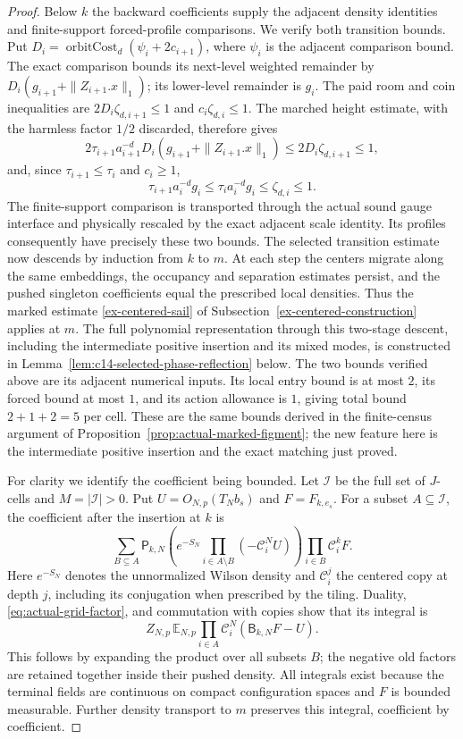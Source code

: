 \begin{proof}
Below $k$ the backward coefficients supply the adjacent density identities
and finite-support forced-profile comparisons. We verify both transition
bounds. Put $D_i=\operatorname{orbitCost}_d(\psi_i+2c_{i+1})$, where
$\psi_i$ is the adjacent comparison bound. The exact comparison bounds
its next-level weighted remainder by
$D_i(g_{i+1}+\|Z_{i+1}.x\|_1)$; its lower-level remainder is $g_i$.
The paid room and coin inequalities are
$2D_i\zeta_{d,i+1}\leq1$ and $c_i\zeta_{d,i}\leq1$.
The marched height estimate, with the harmless factor $1/2$ discarded,
therefore gives
\[
 2\tau_{i+1}a_{i+1}^{-d}
     D_i(g_{i+1}+\|Z_{i+1}.x\|_1)
       \leq2D_i\zeta_{d,i+1}\leq1,
\]
and, since $\tau_{i+1}\leq\tau_i$ and $c_i\geq1$,
\[
 \tau_{i+1}a_i^{-d}g_i
       \leq\tau_i a_i^{-d}g_i\leq\zeta_{d,i}\leq1.
\]
The finite-support comparison is transported through the actual sound
gauge interface and physically rescaled by the exact adjacent scale identity.
Its profiles consequently have precisely these two bounds. The selected
transition estimate now descends by induction from $k$ to $m$.
At each step the centers migrate along the
same embeddings, the occupancy and separation estimates persist, and the
pushed singleton coefficients equal the prescribed local densities.
Thus the marked estimate \eqref{ex-centered-sail} of
Subsection~\ref{ex-centered-construction} applies at $m$. The full
polynomial representation through this two-stage descent, including the
intermediate positive insertion and its mixed modes, is constructed in
Lemma~\ref{lem:c14-selected-phase-reflection} below. The two bounds
verified above are its adjacent numerical inputs. Its local entry bound
is at most $2$, its forced bound at most $1$,
and its action allowance is $1$, giving total bound $2+1+2=5$ per cell.
These are the same bounds derived in the finite-census argument of
Proposition~\ref{prop:actual-marked-figment}; the new feature here is the
intermediate positive insertion and the exact matching just proved.

For clarity we identify the coefficient being bounded. Let $\mathcal I$
be the full set of $J$-cells and $M=|\mathcal I|>0$. Put
$U=O_{N,p}(T_Nb_s)$ and $F=F_{k,e_s}$. For a subset
$A\subseteq\mathcal I$, the coefficient after the insertion at $k$ is
\[
 \sum_{B\subseteq A}
 \mathsf P_{k,N}\left(e^{-S_N}
                \prod_{i\in A\setminus B}(-\mathcal C_i^NU)\right)
                 \prod_{i\in B}\mathcal C_i^kF .
\]
Here $e^{-S_N}$ denotes the unnormalized Wilson density and
$\mathcal C_i^j$ the centered copy at depth $j$, including its conjugation
when prescribed by the tiling. Duality, \eqref{eq:actual-grid-factor},
and commutation with copies show that its integral is
\[
 Z_{N,p}\,\mathbb E_{N,p}
       \prod_{i\in A}\mathcal C_i^N(\mathsf B_{k,N}F-U).
\]
This follows by expanding the product over all subsets $B$; the negative
old factors are retained together inside their pushed density. All
integrals exist because the terminal fields are continuous on compact
configuration spaces and $F$ is bounded measurable. Further density
transport to $m$ preserves this integral, coefficient by coefficient.


\end{proof}
